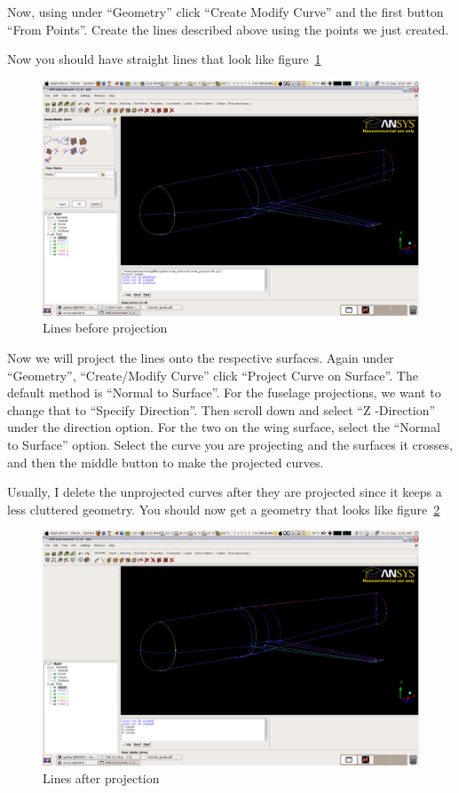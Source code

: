 \documentclass{report}
\begin{document}
Now, using under ``Geometry'' click ``Create Modify Curve'' and the first button ``From Points''. Create the lines described above using the points we just created.

Now you should have straight lines that look like figure~\ref{fig:lines}

\begin{figure}[htb]
  \centering
  \includegraphics[width=\textwidth,angle=0]{figures/fig6.png}
  \caption{Lines before projection}
  \label{fig:lines}
\end{figure}

Now we will project the lines onto the respective surfaces. Again under ``Geometry'', ``Create/Modify Curve'' click ``Project Curve on Surface''. The default method is ``Normal to Surface''. For the fuselage projections, we want to change that to ``Specify Direction''. Then scroll down and select ``Z -Direction'' under the direction option.
For the two on the wing surface, select the ``Normal to Surface'' option. Select the curve you are projecting and the surfaces it crosses, and then the middle button to make the projected curves. 

Usually, I delete the unprojected curves after they are projected since it keeps a less cluttered geometry. You should now get a geometry that looks like figure~\ref{fig:projected_lines}

\begin{figure}[htb]
  \centering
  \includegraphics[width=\textwidth,angle=0]{figures/fig7.png}
  \caption{Lines after projection}
  \label{fig:projected_lines}
\end{figure}
\end{document}
